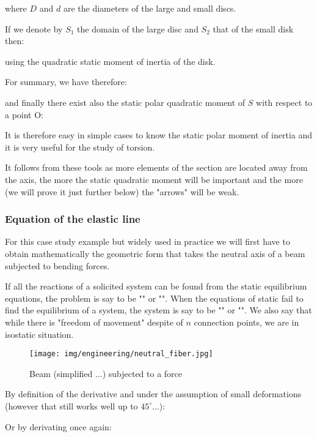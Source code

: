	where $D$ and $d$ are the diameters of the large and small discs.

	If we denote by $S_1$ the domain of the large disc and $S_2$ that of the small disk then:
	
	using the quadratic static moment of inertia of the disk.
	
	For summary, we have therefore:
	
	and finally there exist also the static polar quadratic moment of $S$ with respect to a point O:
	
	It is therefore easy in simple cases to know the static polar moment of inertia and it is very useful for the study of torsion.

	It follows from these tools as more elements of the section are located away from the axis, the more the static quadratic moment will be important and the more (we will prove it just further below) the "arrows" will be weak.
	
	\pagebreak
	\subsubsection{Equation of the elastic line}
	For this case study example but widely used in practice we will first have to obtain mathematically the geometric form that takes the neutral axis of a beam subjected to bending forces.
	
	\begin{tcolorbox}[title=Remark,colframe=black,arc=10pt]
	 If all the reactions of a solicited system can be found from the static equilibrium equations, the problem is say to be "" or "". When the equations of static fail to find the equilibrium of a system, the system is say to be "" or "". We also say that while there is "freedom of movement" despite of $n$ connection points, we are in isostatic situation.
	\end{tcolorbox}
	\begin{figure}[H]
		\centering
		\texttt{[image: img/engineering/neutral\_fiber.jpg]}
		\caption{Beam (simplified ...) subjected to a force}
	\end{figure}
	By definition of the derivative and under the assumption of small deformations (however that still works well up to $45^\circ$...):
	
	Or by derivating once again:
	
